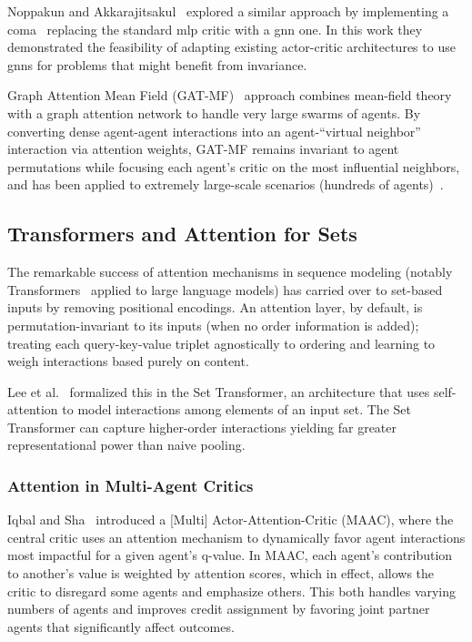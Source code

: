 Noppakun and Akkarajitsakul~\cite{noppakun2022} explored a similar
approach by implementing a \gls{coma}~\cite{foerster2018}
replacing the standard \gls{mlp} critic with a \gls{gnn} one.
In this work they demonstrated the feasibility of adapting
existing actor-critic architectures to use \glspl{gnn}
for problems that might benefit from invariance.

Graph Attention Mean Field (GAT-MF)~\cite{hao2023} approach combines mean-field 
theory with a graph attention network to handle very large swarms of agents. 
By converting dense agent-agent interactions into an agent-“virtual neighbor” 
interaction via attention weights, GAT-MF remains invariant to agent permutations 
while focusing each agent's critic on the most influential neighbors, 
and has been applied to extremely large-scale scenarios (hundreds of agents)~\cite{hao2022}.


\subsection{Transformers and Attention for Sets}

The remarkable success of attention mechanisms in sequence modeling 
(notably Transformers~\cite{vaswani2017} applied to large language models) 
has carried over to set-based inputs by removing positional encodings. 
An attention layer, by default, is permutation-invariant to its inputs 
(when no order information is added); treating each query-key-value triplet 
agnostically to ordering and learning to weigh interactions based purely on content. 

Lee et al.~\cite{lee2019} 
formalized this in the Set Transformer, an architecture that uses 
self-attention to model interactions among elements of an input set. 
The Set Transformer can capture higher-order interactions
yielding far greater representational power than naive pooling. 

\subsubsection{Attention in Multi-Agent Critics}
Iqbal and Sha~\cite{iqbal2019} introduced a [Multi] Actor-Attention-Critic (MAAC), 
where the central critic uses an attention mechanism to dynamically 
favor agent interactions most impactful for a given agent's \Gls{q}-value. 
In MAAC, each agent's contribution to another's value is weighted by attention scores, 
which in effect, allows the critic to disregard some agents and emphasize others. 
This both handles varying numbers of agents and improves credit assignment by 
favoring joint partner agents that significantly affect outcomes. 


